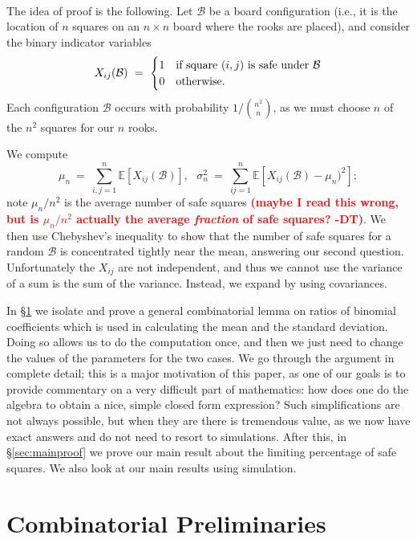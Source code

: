 \documentclass[12pt,reqno]{amsart}
\newcommand{\E}{\mathbb{E}}
\renewcommand{\E}{\mathbb{E}}
\numberwithin{equation}{section}
\theoremstyle{plain}
\newcommand\be{\begin{equation}}
\newcommand\ee{\end{equation}}
\newcommand{\ncr}[2]{{#1 \choose #2}}
\newcommand{\twocase}[5]{#1 \begin{cases} #2 & \text{{\rm #3}}\\ #4 &\text{{\rm #5}} \end{cases}}
\newcommand{\fix}[1]{\textcolor{red}{\textbf{\large (#1)\normalsize}}}
\begin{document}
\ \\

The idea of proof is the following. Let $\mathcal{B}$ be a board configuration (i.e., it is the location of $n$ squares on an $n\times n$ board where the rooks are placed), and consider the binary indicator variables \be \twocase{X_{ij}(\mathcal{B}) \ = \ }{1}{if square $(i,j)$ is safe under $\mathcal{B}$}{0}{otherwise.} \ee Each configuration $\mathcal{B}$ occurs with probability $1/\ncr{n^2}{n}$, as we must choose $n$ of the $n^2$ squares for our $n$ rooks.

We compute \be \mu_n \ = \ \sum_{i,j=1}^n \E[X_{ij}(\mathcal{B})], \ \ \ \sigma_n^2 \ = \ \sum_{ij=1}^n \E[X_{ij}(\mathcal{B}) - \mu_n)^2]; \ee note $\mu_n/n^2$ is the average number of safe squares \fix{maybe I read this wrong, but is $\mu_n / n^2$ actually the average \emph{fraction} of safe squares? -DT}. We then use Chebyshev's inequality to show that the number of safe squares for a random $\mathcal{B}$ is concentrated tightly near the mean, answering our second question. Unfortunately the $X_{ij}$ are not independent, and thus we cannot use the variance of a sum is the sum of the variance. Instead, we expand by using covariances.

In \S\ref{sec:combprelim} we isolate and prove a general combinatorial lemma on ratios of binomial coefficients which is used in calculating the mean and the standard deviation. Doing so allows us to do the computation once, and then we just need to change the values of the parameters for the two cases. We go through the argument in complete detail; this is a major motivation of this paper, as one of our goals is to provide commentary on a very difficult part of mathematics: how does one do the algebra to obtain a nice, simple closed form expression? Such simplifications are not always possible, but when they are there is tremendous value, as we now have exact answers and do not need to resort to simulations. After this, in \S\ref{sec:mainproof} we prove our main result about the limiting percentage of safe squares. We also look at our main results using simulation.


\section{Combinatorial Preliminaries}\label{sec:combprelim}
\end{document}
